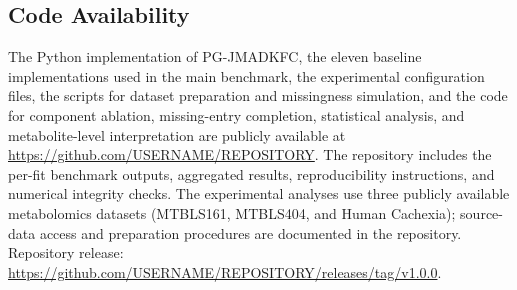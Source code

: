 \subsection*{Code Availability}
The Python implementation of PG-JMADKFC, the eleven baseline implementations used in the main benchmark, the experimental configuration files, the scripts for dataset preparation and missingness simulation, and the code for component ablation, missing-entry completion, statistical analysis, and metabolite-level interpretation are publicly available at \url{https://github.com/USERNAME/REPOSITORY}. The repository includes the per-fit benchmark outputs, aggregated results, reproducibility instructions, and numerical integrity checks. The experimental analyses use three publicly available metabolomics datasets (MTBLS161, MTBLS404, and Human Cachexia); source-data access and preparation procedures are documented in the repository. Repository release: \url{https://github.com/USERNAME/REPOSITORY/releases/tag/v1.0.0}.
